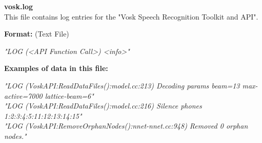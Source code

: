 \begin{description}
\begin{addmargin}[0em]{0em}
    \label{vosk.log}
    \begin{addmargin}[1em]{0em} %
        \textbf{vosk.log}\\
        This file contains log entries for the "Vosk Speech Recognition Toolkit and API".
        \begin{addmargin}[1em]{0em}
            \textbf{Format:} (Text File)
            \begin{addmargin}[1em]{0em}
                \textit{"LOG (<API Function Call>) <info>"}
            \end{addmargin}
        \end{addmargin}
        \begin{addmargin}[1em]{0em}
            \textbf{Examples of data in this file:}
            \begin{addmargin}[1em]{0em}\textit{"LOG (VoskAPI:ReadDataFiles():model.cc:213) Decoding params beam=13 max-active=7000 lattice-beam=6"\\
                "LOG (VoskAPI:ReadDataFiles():model.cc:216) Silence phones 1:2:3:4:5:11:12:13:14:15"\\
                "LOG (VoskAPI:RemoveOrphanNodes():nnet-nnet.cc:948) Removed 0 orphan nodes."}
            \end{addmargin}
        \end{addmargin}
    \end{addmargin} %
    \textbf{\\}
 
\end{addmargin} %



\end{description}
